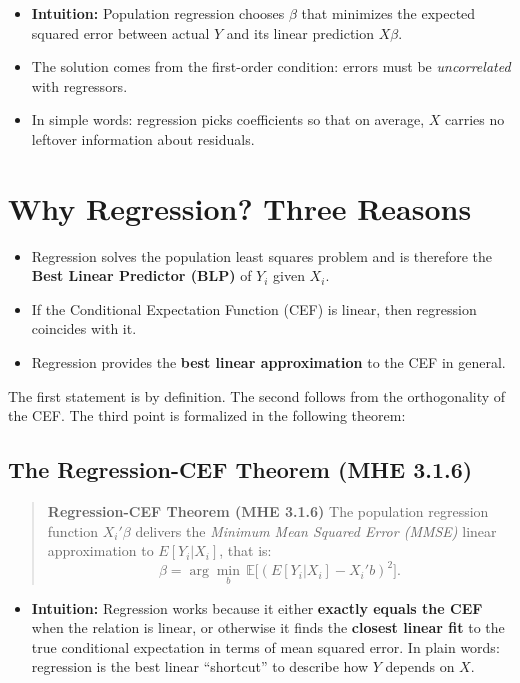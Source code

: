 \documentclass[12pt]{article}
\begin{document}
\begin{itemize}
    \item \textbf{Intuition:} Population regression chooses $\beta$ that minimizes the expected squared error between actual $Y$ and its linear prediction $X\beta$.  
    \item The solution comes from the first-order condition: errors must be \textit{uncorrelated} with regressors.  
    \item In simple words: regression picks coefficients so that on average, $X$ carries no leftover information about residuals.  
\end{itemize}

\section*{\noindent\textbf{Why Regression? Three Reasons}}

\begin{itemize}
    \item Regression solves the population least squares problem and is therefore the \textbf{Best Linear Predictor (BLP)} of $Y_i$ given $X_i$.
    \item If the Conditional Expectation Function (CEF) is linear, then regression coincides with it.
    \item Regression provides the \textbf{best linear approximation} to the CEF in general.
\end{itemize}

\noindent The first statement is by definition. The second follows from the orthogonality of the CEF. The third point is formalized in the following theorem:


\subsection*{\noindent\textbf{The Regression-CEF Theorem (MHE 3.1.6)}}

\begin{quote}
\textbf{Regression-CEF Theorem (MHE 3.1.6)}  
The population regression function $X_i'\beta$ delivers the \textit{Minimum Mean Squared Error (MMSE)} linear approximation to $E[Y_i|X_i]$, that is:
\[
\beta = \arg \min_b \, \mathbb{E}\big[ (E[Y_i|X_i] - X_i'b)^2 \big].
\]
\end{quote}

\begin{itemize}
    \item \textbf{Intuition:} Regression works because it either \textbf{exactly equals the CEF} when the relation is linear, or otherwise it finds the \textbf{closest linear fit} to the true conditional expectation in terms of mean squared error. In plain words: regression is the best linear “shortcut” to describe how $Y$ depends on $X$.
\end{itemize}
\end{document}
